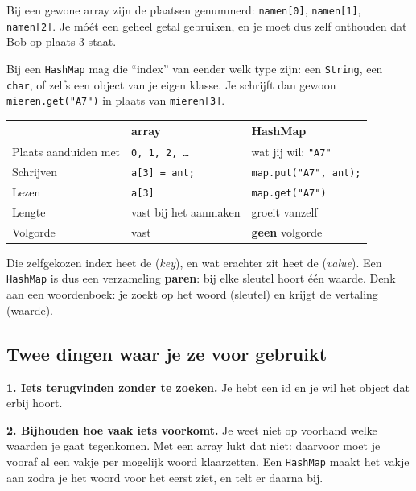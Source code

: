 \documentclass[a4paper,11pt]{article}
\begin{document}
Bij een gewone array zijn de plaatsen genummerd: \texttt{namen[0]},
\texttt{namen[1]}, \texttt{namen[2]}. Je m\'o\'et een geheel getal gebruiken, en
je moet dus zelf onthouden dat Bob op plaats 3 staat.

Bij een \texttt{HashMap} mag die ``index'' van eender welk type zijn: een
\texttt{String}, een \texttt{char}, of zelfs een object van je eigen klasse. Je
schrijft dan gewoon \texttt{mieren.get("A7")} in plaats van
\texttt{mieren[3]}.

\begin{center}
    \begin{tabular}{@{}lll@{}}
        \toprule
                             & \textbf{array}          & \textbf{HashMap}             \\
        \midrule
        Plaats aanduiden met & \texttt{0, 1, 2, \dots} & wat jij wil: \texttt{"A7"}   \\
        Schrijven            & \texttt{a[3] = ant;}    & \texttt{map.put("A7", ant);} \\
        Lezen                & \texttt{a[3]}           & \texttt{map.get("A7")}       \\
        Lengte               & vast bij het aanmaken   & groeit vanzelf               \\
        Volgorde             & vast                    & \textbf{geen} volgorde       \\
        \bottomrule
    \end{tabular}
\end{center}

Die zelfgekozen index heet de  (\textit{key}), en wat erachter
zit heet de  (\textit{value}). Een \texttt{HashMap} is dus een
verzameling \textbf{paren}: bij elke sleutel hoort \'e\'en waarde. Denk aan een
woordenboek: je zoekt op het woord (sleutel) en krijgt de vertaling (waarde).

\subsection{Twee dingen waar je ze voor gebruikt}

\textbf{1. Iets terugvinden zonder te zoeken.} Je hebt een id en je wil het
object dat erbij hoort.

\medskip
\textbf{2. Bijhouden hoe vaak iets voorkomt.} Je weet niet op voorhand welke
waarden je gaat tegenkomen. Met een array lukt dat niet: daarvoor moet je vooraf
al een vakje per mogelijk woord klaarzetten. Een \texttt{HashMap} maakt het vakje
aan zodra je het woord voor het eerst ziet, en telt er daarna bij.
\end{document}
